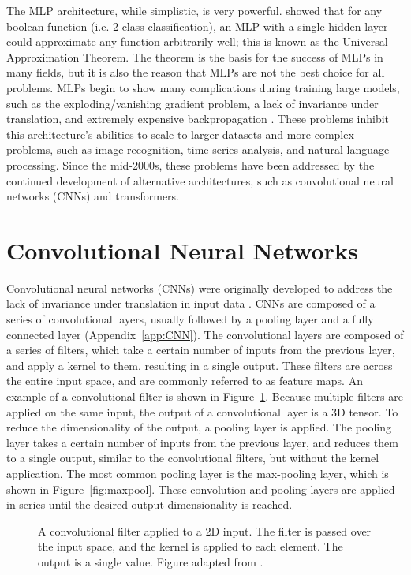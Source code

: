 The MLP architecture, while simplistic, is very powerful. \textcite{cybenko1989} showed that for any boolean 
function (i.e. 2-class classification), an MLP with a single hidden layer could 
approximate any function arbitrarily well; this is known as the Universal Approximation
Theorem. The theorem is the basis for the success of MLPs in
many fields, but it is also the reason that MLPs are not the best choice for all problems.
MLPs begin to show many complications during training large models, such as the 
exploding/vanishing gradient problem, a lack of invariance under translation, 
and extremely expensive backpropagation \parencite{Naskath2022}. These problems inhibit this architecture's 
abilities to scale to larger datasets and more complex problems, such as 
image recognition, time series analysis, and natural language processing. Since 
the mid-2000s, these problems have been addressed by the continued development of 
alternative architectures, such as convolutional neural networks (CNNs) and
transformers.

\section{Convolutional Neural Networks}\label{sec:CNN}
Convolutional neural networks (CNNs) were originally developed
to address the lack of invariance under translation in input data \parencite{fukushima1979}.
CNNs are composed of a series of convolutional layers, usually followed by a 
pooling layer and a fully connected layer (Appendix~\ref{app:CNN}). The convolutional 
layers are composed of a series of filters, which take a certain 
number of inputs from the previous layer, and apply a kernel to them, resulting in 
a single output. These filters are across the entire input space, and are 
commonly referred to as feature maps. An example of a convolutional filter 
is shown in Figure~\ref{fig:convolution}. Because multiple filters are applied 
on the same input, the output of a convolutional layer is a 3D tensor. 
To reduce the dimensionality of the output, a pooling layer is applied.
The pooling layer takes a certain number of inputs from the previous layer, and 
reduces them to a single output, similar to the convolutional filters, but 
without the kernel application. The most common pooling layer is the max-pooling
layer, which is shown in Figure~\ref{fig:maxpool}. These convolution and pooling 
layers are applied in series until the desired output dimensionality is reached.
\begin{figure}
    \centering 
    
    \caption{A convolutional filter applied to a 2D input. The filter is passed 
        over the input space, and the kernel is applied to each element. The
        output is a single value. Figure adapted from \textcite{neutelings2023}.}
    \label{fig:convolution}
\end{figure}

